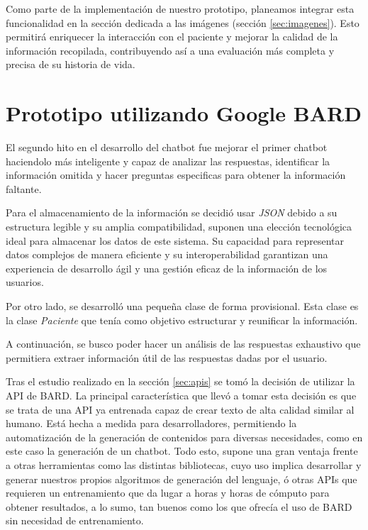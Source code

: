 Como parte de la implementación de nuestro prototipo, planeamos integrar esta funcionalidad en la sección dedicada a las imágenes (sección \ref{sec:imagenes}). Esto permitirá enriquecer la interacción con el paciente y mejorar la calidad de la información recopilada, contribuyendo así a una evaluación más completa y precisa de su historia de vida. 

\section{Prototipo utilizando Google BARD}
\label{sec:prototipoBARD}
El segundo hito en el desarrollo del chatbot fue mejorar el primer chatbot haciendolo más inteligente y capaz de analizar las respuestas, identificar la información omitida y hacer preguntas especificas para obtener la información faltante. 

Para el almacenamiento de la información se decidió usar \textit{JSON} debido a su estructura legible y su amplia compatibilidad, suponen una elección tecnológica ideal para almacenar los datos de este sistema. Su capacidad para representar datos complejos de manera eficiente y su interoperabilidad garantizan una experiencia de desarrollo ágil y una gestión eficaz de la información de los usuarios. 

Por otro lado, se desarrolló una pequeña clase de forma provisional. Esta clase es la clase \textit{Paciente} que tenía como objetivo estructurar y reunificar la información.

A continuación, se busco poder hacer un análisis de las respuestas exhaustivo que permitiera extraer información útil de las respuestas dadas por el usuario.

Tras el estudio realizado en la sección \ref{sec:apis} se tomó la decisión de utilizar la API de BARD. La principal característica que llevó a tomar esta decisión es que se trata de una API ya entrenada capaz de crear texto de alta calidad similar al humano. Está hecha a medida para desarrolladores, permitiendo la automatización de la generación de contenidos para diversas necesidades, como en este caso la generación de un chatbot. Todo esto, supone una gran ventaja frente a otras herramientas como las distintas bibliotecas, cuyo uso implica desarrollar y generar nuestros propios algoritmos de generación del lenguaje, ó otras APIs que requieren un entrenamiento que da lugar a horas y horas de cómputo para obtener resultados, a lo sumo, tan buenos como los que ofrecía el uso de BARD sin necesidad de entrenamiento. 

